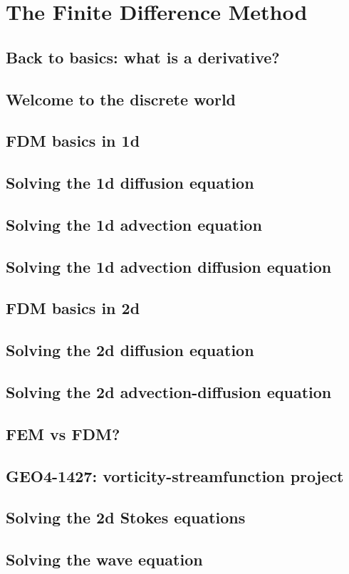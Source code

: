 \chapter{The Finite Difference Method} %

\section{Back to basics: what is a derivative?} 
\section{Welcome to the discrete world} 
\section{FDM basics in 1d} \label{ss:fdm_basics1D}  
\section{Solving the 1d diffusion equation} \label{ss:fdm_diff1D} 
\section{Solving the 1d advection equation} \label{ss:fdm_adv1D} 
\newpage
\section{Solving the 1d advection diffusion equation} \label{ss:fdm_advdiff1D} 
\newpage
\section{FDM basics in 2d} \label{ss:fdm_basics2D}  
\newpage
\section{Solving the 2d diffusion equation} \label{ss:fdm_diff2D} 
\section{Solving the 2d advection-diffusion equation} \label{ss:fdm_advdiff2D} 
\newpage
\section{FEM vs FDM?}\label{ss:femvsfdm}   
\newpage
\section{GEO4-1427: vorticity-streamfunction project} 
\newpage
\section{Solving the 2d Stokes equations} \label{ss:fdm_stokes2D} 
\newpage
\section{Solving the wave equation} \label{ss:fdm_wave_eq} 

